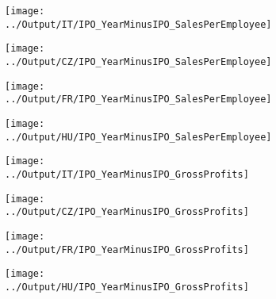 \documentclass[12pt,notitlepage]{article}
\begin{document}
\begin{figure}[!htpb]
\centering
\caption{IPO and Sales per Employee}
\begin{subfigure}{.49\textwidth}
    \centering
 \texttt{[image: ../Output/IT/IPO\_YearMinusIPO\_SalesPerEmployee]}
\end{subfigure}%
\begin{subfigure}{.49\textwidth}
    \centering
 \texttt{[image: ../Output/CZ/IPO\_YearMinusIPO\_SalesPerEmployee]}
\end{subfigure}
\begin{subfigure}{.49\textwidth}
    \centering
 \texttt{[image: ../Output/FR/IPO\_YearMinusIPO\_SalesPerEmployee]}
\end{subfigure}%
\begin{subfigure}{.49\textwidth}
    \centering
 \texttt{[image: ../Output/HU/IPO\_YearMinusIPO\_SalesPerEmployee]}
\end{subfigure}
\end{figure}
\pagebreak

\begin{figure}[!htpb]
\centering
\caption{IPO and Gross Profits}
\begin{subfigure}{.49\textwidth}
    \centering
 \texttt{[image: ../Output/IT/IPO\_YearMinusIPO\_GrossProfits]}
\end{subfigure}%
\begin{subfigure}{.49\textwidth}
    \centering
 \texttt{[image: ../Output/CZ/IPO\_YearMinusIPO\_GrossProfits]}
\end{subfigure}
\begin{subfigure}{.49\textwidth}
    \centering
 \texttt{[image: ../Output/FR/IPO\_YearMinusIPO\_GrossProfits]}
\end{subfigure}%
\begin{subfigure}{.49\textwidth}
    \centering
 \texttt{[image: ../Output/HU/IPO\_YearMinusIPO\_GrossProfits]}
\end{subfigure}
\end{figure}
\pagebreak
\end{document}
